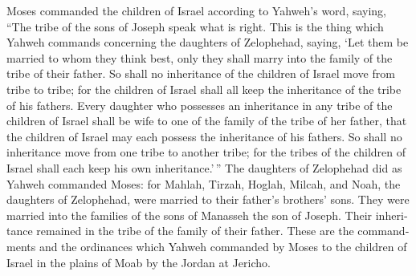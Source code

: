 \begin{paracol}{2}
\begin{otherlanguage}{english}
 Moses commanded the children of Israel according to
Yahweh's word, saying, ``The tribe of the sons of Joseph speak what is
right.  This is the thing which Yahweh commands concerning
the daughters of Zelophehad, saying, `Let them be married to whom they
think best, only they shall marry into the family of the tribe of their
father.  So shall no inheritance of the children of Israel
move from tribe to tribe; for the children of Israel shall all keep the
inheritance of the tribe of his fathers.  Every daughter
who possesses an inheritance in any tribe of the children of Israel
shall be wife to one of the family of the tribe of her father, that the
children of Israel may each possess the inheritance of his fathers.
 So shall no inheritance move from one tribe to another
tribe; for the tribes of the children of Israel shall each keep his own
inheritance.'\,''  The daughters of Zelophehad did as
Yahweh commanded Moses:  for Mahlah, Tirzah, Hoglah,
Milcah, and Noah, the daughters of Zelophehad, were married to their
father's brothers' sons.  They were married into the
families of the sons of Manasseh the son of Joseph. Their inheritance
remained in the tribe of the family of their father. 
These are the commandments and the ordinances which Yahweh commanded by
Moses to the children of Israel in the plains of Moab by the Jordan at
Jericho. \end{otherlanguage} \end{paracol}
